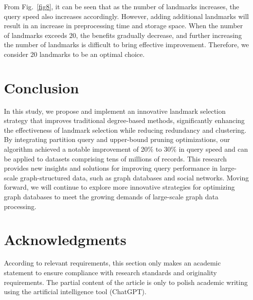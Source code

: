 \documentclass[sigconf]{acmart}
\begin{document}
From Fig.~\ref{fig8}, it can be seen that as the number of landmarks increases, the query speed also increases accordingly. However, adding additional landmarks will result in an increase in preprocessing time and storage space. When the number of landmarks exceeds $20$, the benefits gradually decrease, and further increasing the number of landmarks is difficult to bring effective improvement. Therefore, we consider $20$ landmarks to be an optimal choice.

%
%

\section{Conclusion}
\label{sec:conclusion}
In this study, we propose and implement an innovative landmark selection strategy that improves traditional degree-based methods, significantly enhancing the effectiveness of landmark selection while reducing redundancy and clustering. By integrating partition query and upper-bound pruning optimizations, our algorithm achieved a notable improvement of 20\% to 30\% in query speed and can be applied to datasets comprising tens of millions of records. This research provides new insights and solutions for improving query performance in large-scale graph-structured data, such as graph databases and social networks. Moving forward, we will continue to explore more innovative strategies for optimizing graph databases to meet the growing demands of large-scale graph data processing.

 
\section{Acknowledgments}
According to relevant requirements, this section only makes an academic statement to ensure compliance with research standards and originality requirements. The partial content of the article is only to polish academic writing using the artificial intelligence tool (ChatGPT).



\appendix
\end{document}
